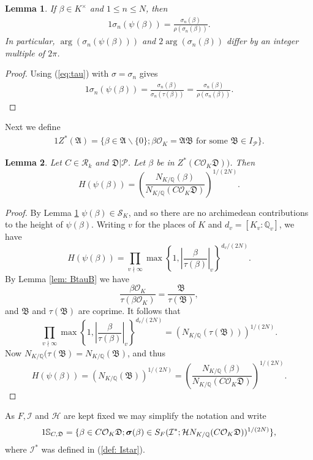 \documentclass[11pt]{amsart}
\newtheorem{lemma}{Lemma}[section]
\numberwithin{equation}{eqncounter}
\def\IQ{\mathbb Q}
\def\IS{\mathbb S}
\def\Pc{\mathcal{P}}
\def\H{\mathcal{H}}
\def\I{\mathcal{I}}
\def\R{\mathcal{R}}
\def\B{\mathfrak{B}}
\def\A{\mathfrak{A}}
\def\D{\mathfrak{D}}
\def\Zstar{Z^*}
\renewcommand{\vec}[1]{\mbox{\boldmath$#1$}}
\def\Oseen{{\mathcal{O}}}
\def\Sc{\mathcal{S}}
\def\bsigma{{\vec{\sigma}}}
\begin{document}
\begin{lemma}\label{lem: psibasics}
If $\beta\in K^\times$ and $1\leq n\leq N$, then
\begin{alignat*}1
\sigma_n(\psi(\beta))=\frac{\sigma_n(\beta)}{\rho(\sigma_n(\beta))}.
\end{alignat*}
In particular, $\arg(\sigma_n(\psi(\beta)))$ and $2\arg(\sigma_n(\beta))$ differ by an integer multiple of $2\pi$.
\end{lemma}
\begin{proof}
Using (\ref{eq:tau}) with $\sigma=\sigma_n$ gives
\begin{alignat*}1
\sigma_n(\psi(\beta))=\frac{\sigma_n(\beta)}{\sigma_n(\tau(\beta))}=\frac{\sigma_n(\beta)}{\rho(\sigma_n(\beta))}.
\end{alignat*}
\end{proof}






 
 Next we define 
\begin{alignat*}1
Z^*(\A)=\{\beta\in \A\backslash\{0\}; \beta\Oseen_K=\A\B \text{ for some } \B\in I_\Pc\}.
\end{alignat*}


\begin{lemma}\label{lem: psibetaheight}
Let $C\in \R_k$ and $\D|\Pc$.
Let $\beta$ be in $\Zstar(C\Oseen_K\D))$. Then
$$H(\psi(\beta))=\left(\frac{N_{K/\IQ}(\beta)}{N_{K/\IQ}(C\Oseen_K\D)}\right)^{1/(2N)}.$$
\end{lemma}
\begin{proof}
By Lemma \ref{lem: psibasics} 
$\psi(\beta)\in \Sc_K$, and so there are no archimedean contributions to the height of $\psi(\beta)$.
Writing $v$ for the places of $K$ and $d_v=[K_v:\IQ_v]$, we have
$$H(\psi(\beta))=\prod_{v\nmid \infty}\max\left\{1,\left|\frac{\beta}{\tau(\beta)}\right|_v\right\}^{d_v/(2N)}.$$ 
By Lemma \ref{lem: BtauB} we have 
$$\frac{\beta\Oseen_K}{\tau(\beta\Oseen_K)}=\frac{\B}{\tau(\B)},$$
and  $\B$ and $\tau(\B)$ are coprime.
It follows that
$$\prod_{v\nmid \infty}\max\left\{1,\left|\frac{\beta}{\tau(\beta)}\right|_v\right\}^{d_v/(2N)}=\left(N_{K/\IQ}(\tau(\B))\right)^{1/(2N)}.$$ 
Now $N_{K/\IQ}(\tau(\B)=N_{K/\IQ}(\B)$, and thus
$$H(\psi(\beta))=\left(N_{K/\IQ}(\B)\right)^{1/(2N)}=\left(\frac{N_{K/\IQ}(\beta)}{N_{K/\IQ}(C\Oseen_K\D)}\right)^{1/(2N)}.$$
\end{proof}

As $F, \I$ and $\H$ are kept fixed we may 
simplify the notation and write 
\begin{alignat}1\label{def: SCD}
\IS_{C,\D}=\{\beta\in C\Oseen_K\D; \bsigma(\beta)\in S_F(\I^*;\H N_{K/\IQ}(C\Oseen_K\D))^{1/(2N)}\},
\end{alignat}
where $\I^*$ was defined in (\ref{def: Istar}).
\end{document}
